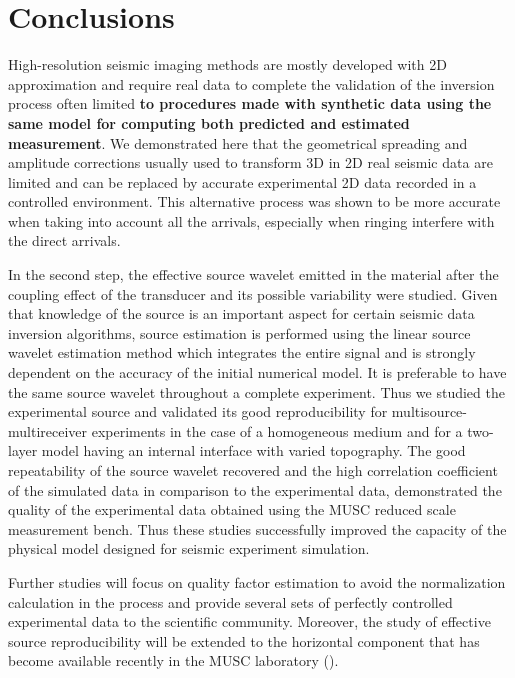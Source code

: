 \documentclass[extra,mreferee]{gji}
\begin{document}

\section{Conclusions}

High-resolution seismic imaging methods are mostly developed with 2D approximation and require real data to complete the validation of the inversion process often limited \textbf{to procedures made with synthetic data using the same model for computing both predicted and estimated measurement}. We demonstrated here that the geometrical spreading and amplitude corrections usually used to transform 3D in 2D real seismic data are limited and can be replaced by accurate experimental 2D data recorded in a controlled environment. This alternative process was shown to be more accurate when taking into account all the arrivals, especially 
when ringing interfere with the direct arrivals.

In the second step, the effective source wavelet emitted in the material after the coupling effect of the transducer and its possible variability were studied. Given that knowledge of the source is an important aspect for certain seismic data inversion algorithms, source estimation is performed using the linear source wavelet estimation method which integrates the entire signal and is strongly dependent on the accuracy of the initial numerical model. It is preferable to have the same source wavelet throughout a complete experiment. Thus we studied the experimental source and validated its good reproducibility for multisource-multireceiver experiments in the case of a homogeneous medium and for a two-layer model having an internal interface with varied topography. The good repeatability of the source wavelet recovered and the high correlation coefficient of the simulated data in comparison to the experimental data, demonstrated the quality of the experimental data obtained using the MUSC reduced scale measurement bench. 
Thus these studies successfully improved the capacity of the physical model designed for seismic experiment simulation. 

Further studies will focus on quality factor estimation to avoid the normalization calculation in the process and provide several sets of perfectly controlled experimental data to the scientific community. Moreover, the study of effective source reproducibility will be extended to the horizontal component that has become available recently in the MUSC laboratory (\cite{valensi2015multicomponent}).
\end{document}
